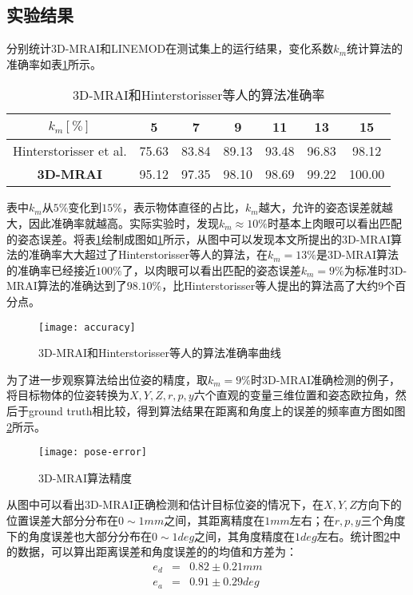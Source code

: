 \subsection{实验结果}
分别统计3D-MRAI和LINEMOD在测试集上的运行结果，变化系数$k_m$统计算法的准确率如表\ref{tab:mrai}所示。
\begin{table}[ht]
  \centering
  \begin{tabular}{ccccccc}
    \toprule
    $k_m[\%]$&5&7&9&11&13&15\\
    \midrule
    Hinterstorisser et al.&75.63& 83.84& 89.13& 93.48& 96.83&98.12\\
    \bf{3D-MRAI}&95.12& 97.35& 98.10& 98.69& 99.22& 100.00\\
    \bottomrule
  \end{tabular}
  \caption{3D-MRAI和Hinterstorisser等人的算法准确率}
  \label{tab:mrai}
\end{table}
表中$k_m$从$5\%$变化到$15\%$，表示物体直径的占比，$k_m$越大，允许的姿态误差就越大，因此准确率就越高。实际实验时，发现$k_m\approx 10\%$时基本上肉眼可以看出匹配的姿态误差。将表\ref{tab:mrai}绘制成图如\ref{fig:mrai}所示，从图中可以发现本文所提出的3D-MRAI算法的准确率大大超过了Hinterstorisser等人的算法，在$k_m=13\%$是3D-MRAI算法的准确率已经接近$100\%$了，以肉眼可以看出匹配的姿态误差$k_m=9\%$为标准时3D-MRAI算法的准确达到了$98.10\%$，比Hinterstorisser等人提出的算法高了大约$9$个百分点。
\begin{figure}[ht]
  \centering
  \texttt{[image: accuracy]}
  \caption{3D-MRAI和Hinterstorisser等人的算法准确率曲线}
  \label{fig:mrai}
\end{figure}

为了进一步观察算法给出位姿的精度，取$k_m=9\%$时3D-MRAI准确检测的例子，将目标物体的位姿转换为$X,Y,Z,r,p,y$六个直观的变量三维位置和姿态欧拉角，然后于ground truth相比较，得到算法结果在距离和角度上的误差的频率直方图如图\ref{fig:pose-error}所示。
\begin{figure}[ht]
  \centering
  \texttt{[image: pose-error]}
  \caption{3D-MRAI算法精度}
  \label{fig:pose-error}
\end{figure}
从图中可以看出3D-MRAI正确检测和估计目标位姿的情况下，在$X,Y,Z$方向下的位置误差大部分分布在$0\sim 1mm$之间，其距离精度在$1mm$左右；在$r,p,y$三个角度下的角度误差也大部分分布在$0\sim 1deg$之间，其角度精度在$1deg$左右。统计图\ref{fig:pose-error}中的数据，可以算出距离误差和角度误差的的均值和方差为：
\begin{equation}
  \begin{array}{ccc}
    e_d &=& 0.82\pm0.21mm\\
    e_a &=& 0.91\pm0.29deg
  \end{array}
\end{equation}

